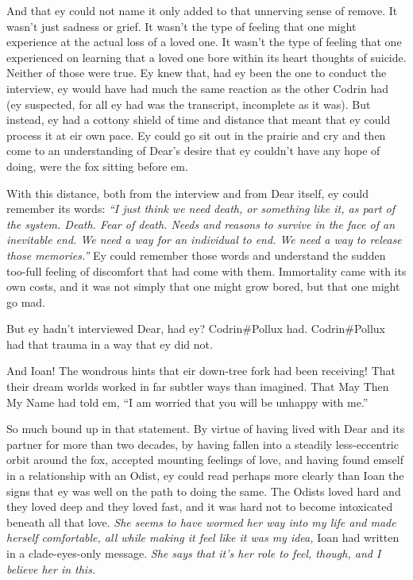 And that ey could not name it only added to that unnerving sense of remove. It wasn't just sadness or grief. It wasn't the type of feeling that one might experience at the actual loss of a loved one. It wasn't the type of feeling that one experienced on learning that a loved one bore within its heart thoughts of suicide. Neither of those were true. Ey knew that, had ey been the one to conduct the interview, ey would have had much the same reaction as the other Codrin had (ey suspected, for all ey had was the transcript, incomplete as it was). But instead, ey had a cottony shield of time and distance that meant that ey could process it at eir own pace. Ey could go sit out in the prairie and cry and then come to an understanding of Dear's desire that ey couldn't have any hope of doing, were the fox sitting before em.

With this distance, both from the interview and from Dear itself, ey could remember its words: \emph{``I just think we need death, or something like it, as part of the system. Death. Fear of death. Needs and reasons to survive in the face of an inevitable end. We need a way for an individual to end. We need a way to release those memories.''} Ey could remember those words and understand the sudden too-full feeling of discomfort that had come with them. Immortality came with its own costs, and it was not simply that one might grow bored, but that one might go mad.

But ey hadn't interviewed Dear, had ey? Codrin\#Pollux had. Codrin\#Pollux had that trauma in a way that ey did not.

And Ioan! The wondrous hints that eir down-tree fork had been receiving! That their dream worlds worked in far subtler ways than imagined. That May Then My Name had told em, ``I am worried that you will be unhappy with me.''

So much bound up in that statement. By virtue of having lived with Dear and its partner for more than two decades, by having fallen into a steadily less-eccentric orbit around the fox, accepted mounting feelings of love, and having found emself in a relationship with an Odist, ey could read perhaps more clearly than Ioan the signs that ey was well on the path to doing the same. The Odists loved hard and they loved deep and they loved fast, and it was hard not to become intoxicated beneath all that love. \emph{She seems to have wormed her way into my life and made herself comfortable, all while making it feel like it was my idea,} Ioan had written in a clade-eyes-only message. \emph{She says that it's her role to feel, though, and I believe her in this.}


